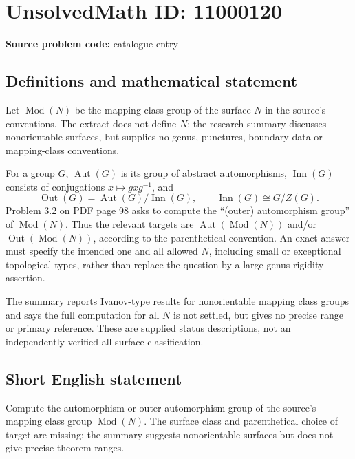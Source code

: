 \documentclass[11pt]{article}
\begin{document}
\section*{UnsolvedMath ID: 11000120}
\textbf{Source problem code:} catalogue entry
\subsection{Definitions and mathematical statement}
Let \(\operatorname{Mod}(N)\) be the mapping class group of the surface \(N\) in the source's conventions. The extract does not define \(N\); the research summary discusses nonorientable surfaces, but supplies no genus, punctures, boundary data or mapping-class conventions.

For a group \(G\), \(\operatorname{Aut}(G)\) is its group of abstract automorphisms, \(\operatorname{Inn}(G)\) consists of conjugations \(x\mapsto gxg^{-1}\), and
\[
 \operatorname{Out}(G)=\operatorname{Aut}(G)/\operatorname{Inn}(G),
 \qquad\operatorname{Inn}(G)\cong G/Z(G).
\]
Problem 3.2 on PDF page 98 asks to compute the ``(outer) automorphism group'' of \(\operatorname{Mod}(N)\). Thus the relevant targets are \(\operatorname{Aut}(\operatorname{Mod}(N))\) and/or \(\operatorname{Out}(\operatorname{Mod}(N))\), according to the parenthetical convention. An exact answer must specify the intended one and all allowed \(N\), including small or exceptional topological types, rather than replace the question by a large-genus rigidity assertion.

The summary reports Ivanov-type results for nonorientable mapping class groups and says the full computation for all \(N\) is not settled, but gives no precise range or primary reference. These are supplied status descriptions, not an independently verified all-surface classification.
\subsection{Short English statement}
Compute the automorphism or outer automorphism group of the source's mapping class group \(\operatorname{Mod}(N)\). The surface class and parenthetical choice of target are missing; the summary suggests nonorientable surfaces but does not give precise theorem ranges.
\end{document}
